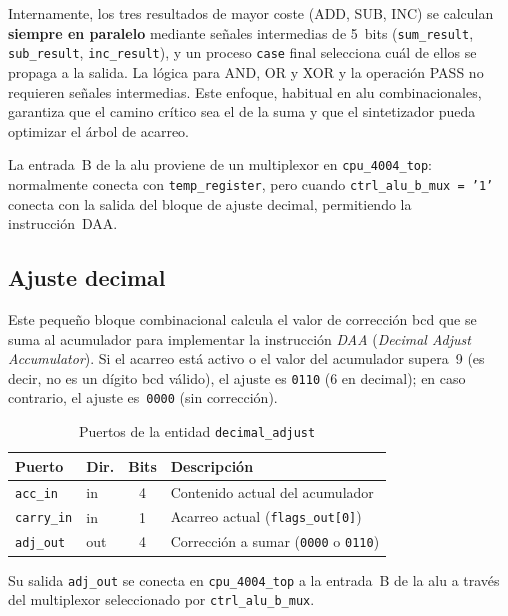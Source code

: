 \documentclass[%
    school=etsisi,%
    type=pfg,%
    degree=61CI,%
]{upm-report}
\newcommand{\vhdlfile}[1]{%
    \par\noindent{\small\sffamily\color{gray}Fichero: \texttt{#1}}\par\smallskip
}
\begin{document}
Internamente, los tres resultados de mayor coste (ADD, SUB, INC) se calculan
\textbf{siempre en paralelo} mediante señales intermedias de 5~bits
(\texttt{sum\_result}, \texttt{sub\_result}, \texttt{inc\_result}), y un
proceso \texttt{case} final selecciona cuál de ellos se propaga a la salida.
La lógica para AND, OR y XOR y la operación PASS no requieren señales
intermedias.  Este enfoque, habitual en \acrshort{alu} combinacionales,
garantiza que el camino crítico sea el de la suma y que el sintetizador
pueda optimizar el árbol de acarreo.

La entrada~B de la \acrshort{alu} proviene de un multiplexor en
\texttt{cpu\_4004\_top}: normalmente conecta con \texttt{temp\_register},
pero cuando \texttt{ctrl\_alu\_b\_mux = '1'} conecta con la salida del bloque
de ajuste decimal, permitiendo la instrucción~DAA.

\subsection{Ajuste decimal}
\label{ss:decimal-adjust}
\vhdlfile{decimal\_adjust.vhd}

Este pequeño bloque combinacional calcula el valor de corrección \acrshort{bcd}
que se suma al acumulador para implementar la instrucción \textit{DAA}
(\textit{Decimal Adjust Accumulator}).  Si el acarreo está activo o el valor
del acumulador supera~9 (es decir, no es un dígito \acrshort{bcd} válido),
el ajuste es \texttt{0110} (6 en decimal); en caso contrario, el ajuste
es~\texttt{0000} (sin corrección).

\begin{table}[H]
\centering
\caption{Puertos de la entidad \texttt{decimal\_adjust}}
\label{tab:decimal-adjust}
\begin{tabularx}{\textwidth}{@{}llcX@{}}
\toprule
\textbf{Puerto}   & \textbf{Dir.} & \textbf{Bits} & \textbf{Descripción} \\
\midrule
\texttt{acc\_in}   & in  & 4 & Contenido actual del acumulador \\
\texttt{carry\_in} & in  & 1 & Acarreo actual (\texttt{flags\_out[0]}) \\
\texttt{adj\_out}  & out & 4 & Corrección a sumar (\texttt{0000} o \texttt{0110}) \\
\bottomrule
\end{tabularx}
\end{table}

Su salida \texttt{adj\_out} se conecta en \texttt{cpu\_4004\_top} a la
entrada~B de la \acrshort{alu} a través del multiplexor seleccionado por
\texttt{ctrl\_alu\_b\_mux}.
\end{document}

